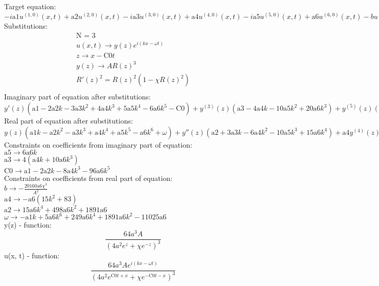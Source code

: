 \documentclass[12pt,a4paper,draft]{article}
\begin{document}
Target equation:
\\$
-i \text{a1} u^{(1,0)}(x,t)+\text{a2} u^{(2,0)}(x,t)-i \text{a3} u^{(3,0)}(x,t)+\text{a4} u^{(4,0)}(x,t)-i \text{a5} u^{(5,0)}(x,t)+\text{a6} u^{(6,0)}(x,t)-b u(x,t) \left| u(x,t)\right| ^2+i u^{(0,1)}(x,t)=0
$\\
Substitutions:
$$
\begin{array}{c}
 \text{N = 3} \\
 u(x,t)\to y(z) e^{i (k x-\omega  t)} \\
 z\to x-\text{C0} t \\
 y(z)\to A R(z)^3 \\
 R'(z)^2=R(z)^2 \left(1-\chi  R(z)^2\right) \\
\end{array}
$$
Imaginary part of equation after substitutions:
\\$
y'(z) \left(\text{a1}-2 \text{a2} k-3 \text{a3} k^2+4 \text{a4} k^3+5 \text{a5} k^4-6 \text{a6} k^5-\text{C0}\right)+y^{(3)}(z) \left(\text{a3}-4 \text{a4} k-10 \text{a5} k^2+20 \text{a6} k^3\right)+y^{(5)}(z) (\text{a5}-6 \text{a6} k)=0
$\\
Real part of equation after substitutions:
\\$
y(z) \left(\text{a1} k-\text{a2} k^2-\text{a3} k^3+\text{a4} k^4+\text{a5} k^5-\text{a6} k^6+\omega \right)+y''(z) \left(\text{a2}+3 \text{a3} k-6 \text{a4} k^2-10 \text{a5} k^3+15 \text{a6} k^4\right)+\text{a4} y^{(4)}(z)+5 \text{a5} k y^{(4)}(z)-15 \text{a6} k^2 y^{(4)}(z)+\text{a6} y^{(6)}(z)-b y(z)^3=0
$\\
Constraints on coefficients from imaginary part of equation:
\\$\text{a5}\to 6 \text{a6} k$\\
$\text{a3}\to 4 \left(\text{a4} k+10 \text{a6} k^3\right)$\\
$\text{C0}\to \text{a1}-2 \text{a2} k-8 \text{a4} k^3-96 \text{a6} k^5$\\
Constraints on coefficients from real part of equation:
\\$b\to -\frac{20160 \text{a6} \chi ^3}{A^2}$\\
$\text{a4}\to -\text{a6} \left(15 k^2+83\right)$\\
$\text{a2}\to 15 \text{a6} k^4+498 \text{a6} k^2+1891 \text{a6}$\\
$\omega \to -\text{a1} k+5 \text{a6} k^6+249 \text{a6} k^4+1891 \text{a6} k^2-11025 \text{a6}$\\


y(z) - function:
$$
\frac{64 a^3 A}{\left(4 a^2 e^z+\chi  e^{-z}\right)^3}
$$
u(x, t) - function:
$$
\frac{64 a^3 A e^{i (k x-\omega  t)}}{\left(4 a^2 e^{\text{C0} t+x}+\chi  e^{-\text{C0} t-x}\right)^3}
$$
\end{document}
